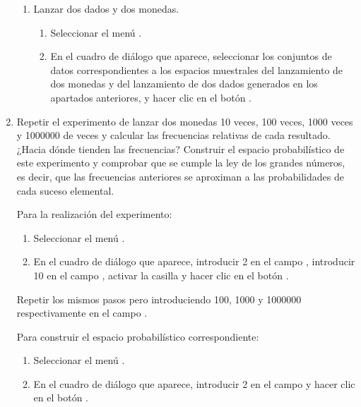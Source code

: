 \begin{enumerate}[leftmargin=*]
\begin{enumerate}
\item Lanzar dos dados y dos monedas. 
\begin{indicacion}
\begin{enumerate}
\item Seleccionar el menú .
\item En el cuadro de diálogo que aparece, seleccionar los conjuntos de datos correspondientes a los espacios muestrales del lanzamiento de
dos monedas y del lanzamiento de dos dados generados en los apartados anteriores, y hacer clic en el botón .
\end{enumerate}
\end{indicacion}
\end{enumerate}  

\item Repetir el experimento de lanzar dos monedas 10 veces, 100 veces, 1000 veces y 1000000 de veces y calcular las frecuencias relativas
de cada resultado. 
¿Hacia dónde tienden las frecuencias? 
Construir el espacio probabilístico de este experimento y comprobar que se cumple la ley de los grandes números, es decir, que las
frecuencias anteriores se aproximan a las probabilidades de cada suceso elemental.
\begin{indicacion}
Para la realización del experimento:
\begin{enumerate}
\item Seleccionar el menú .
\item En el cuadro de diálogo que aparece, introducir 2 en el campo , introducir 10 en el campo , activar la casilla  y hacer clic en el botón .
\end{enumerate}
Repetir los mismos pasos pero introduciendo 100, 1000 y 1000000 respectivamente en el campo .

Para construir el espacio probabilístico correspondiente:
\begin{enumerate}
\item Seleccionar el menú .
\item En el cuadro de diálogo que aparece, introducir 2 en el campo  y hacer clic en el botón .
\end{enumerate}
\end{indicacion}


\end{enumerate}
